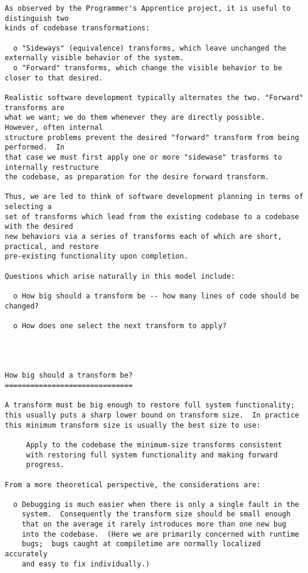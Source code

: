 \begin{verbatim}
As observed by the Programmer's Apprentice project, it is useful to distinguish two
kinds of codebase transformations:

  o "Sideways" (equivalence) transforms, which leave unchanged the externally visible behavior of the system.
  o "Forward" transforms, which change the visible behavior to be closer to that desired.

Realistic software development typically alternates the two. "Forward" transforms are
what we want; we do them whenever they are directly possible.  However, often internal
structure problems prevent the desired "forward" transform from being performed.  In
that case we must first apply one or more "sidewase" trasforms to internally restructure
the codebase, as preparation for the desire forward transform.

Thus, we are led to think of software development planning in terms of selecting a
set of transforms which lead from the existing codebase to a codebase with the desired
new behaviors via a series of transforms each of which are short, practical, and restore
pre-existing functionality upon completion.

Questions which arise naturally in this model include:

  o How big should a transform be -- how many lines of code should be changed?

  o How does one select the next transform to apply?




How big should a transform be?
==============================

A transform must be big enough to restore full system functionality;
this usually puts a sharp lower bound on transform size.  In practice
this minimum transform size is usually the best size to use:

     Apply to the codebase the minimum-size transforms consistent
     with restoring full system functionality and making forward
     progress.

From a more theoretical perspective, the considerations are:

  o Debugging is much easier when there is only a single fault in the
    system.  Consequently the transform size should be small enough
    that on the average it rarely introduces more than one new bug
    into the codebase.  (Here we are primarily concerned with runtime
    bugs;  bugs caught at compiletime are normally localized accurately
    and easy to fix individually.)


\end{verbatim}
